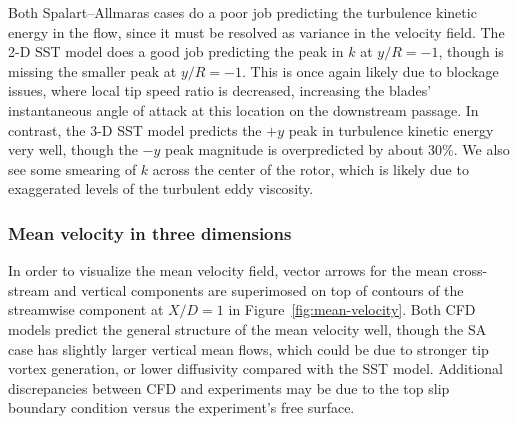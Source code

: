 Both Spalart--Allmaras cases do a poor job predicting the turbulence kinetic
energy in the flow, since it must be resolved as variance in the velocity field.
The 2-D SST model does a good job predicting the peak in $k$ at $y/R=-1$, though
is missing the smaller peak at $y/R=-1$. This is once again likely due to
blockage issues, where local tip speed ratio is decreased, increasing the
blades' instantaneous angle of attack at this location on the downstream
passage. In contrast, the 3-D SST model predicts the $+y$ peak in turbulence
kinetic energy very well, though the $-y$ peak magnitude is overpredicted by
about 30\%. We also see some smearing of $k$ across the center of the rotor,
which is likely due to exaggerated levels of the turbulent eddy viscosity.


\subsubsection{Mean velocity in three dimensions}

In order to visualize the mean velocity field, vector arrows for the mean
cross-stream and vertical components are superimosed on top of contours of the
streamwise component at $X/D=1$ in Figure~\ref{fig:mean-velocity}. Both CFD
models predict the general structure of the mean velocity well, though the SA
case has slightly larger vertical mean flows, which could be due to stronger tip
vortex generation, or lower diffusivity compared with the SST model. Additional
discrepancies between CFD and experiments may be due to the top slip boundary
condition versus the experiment's free surface.

